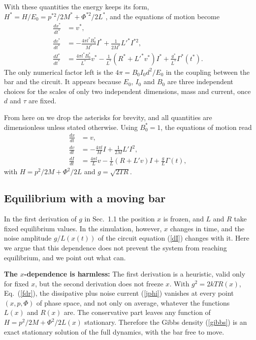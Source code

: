 \documentclass[11pt]{article}
\begin{document}
With these quantities the energy keeps its form, $H^*=H/E_0=p^{*2}/2M^*+\Phi^{*2}/2L^*$, and the equations of motion become
\begin{align}
  \frac{dx^*}{dt^*}&=v^*,\nonumber\\
  \frac{dv^*}{dt^*}&=-\frac{4\pi l^*B_0^*}{M^*}I^*+\frac{1}{2M^*}L'^*I^{*2},\nonumber\\
  \frac{dI^*}{dt^*}&=\frac{4\pi l^*B_0^*}{L^*}v^*-\frac{1}{L^*}\left(R^*+L'^*v^*\right)I^*+\frac{g^*}{L^*}\Gamma^*(t^*).
\end{align}
The only numerical factor left is the $4\pi=B_0I_0d^2/E_0$ in the coupling between the bar and the circuit. It appears because $E_0$, $I_0$ and $B_0$ are three independent choices for the scales of only two independent dimensions, mass and current, once $d$ and $\tau$ are fixed.

From here on we drop the asterisks for brevity, and all quantities are dimensionless unless stated otherwise. Using $B_0^*=1$, the equations of motion read
\begin{align}
  \frac{dx}{dt}&=v,\nonumber\\
  \frac{dv}{dt}&=-\frac{4\pi l}{M}I+\frac{1}{2M}L'I^2,\nonumber\\
  \frac{dI}{dt}&=\frac{4\pi l}{L}v-\frac{1}{L}\left(R+L'v\right)I+\frac{g}{L}\Gamma(t),
  \label{eomdimless}
\end{align}
with $H=p^2/2M+\Phi^2/2L$ and $g=\sqrt{2TR}$.

\subsection{Equilibrium with a moving bar}\label{sec:movingbar}
In the first derivation of $g$ in Sec.~1.1 the position $x$ is frozen, and $L$ and $R$ take fixed equilibrium values. In the simulation, however, $x$ changes in time, and the noise amplitude $g/L(x(t))$ of the circuit equation (\ref{dI}) changes with it. Here we argue that this dependence does not prevent the system from reaching equilibrium, and we point out what can.

{\bf The $x$-dependence is harmless:} The first derivation is a heuristic, valid only for fixed $x$, but the second derivation does not freeze $x$. With $g^2=2kTR(x)$, Eq.~(\ref{fdr}), the dissipative plus noise current (\ref{jphi}) vanishes at every point $(x,p,\Phi)$ of phase space, and not only on average, whatever the functions $L(x)$ and $R(x)$ are. The conservative part leaves any function of $H=p^2/2M+\Phi^2/2L(x)$ stationary. Therefore the Gibbs density (\ref{gibbs}) is an exact stationary solution of the full dynamics, with the bar free to move.
\end{document}
